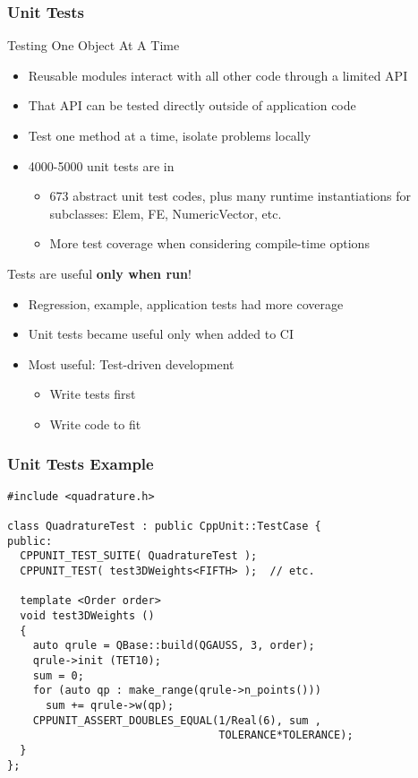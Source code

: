 \begin{frame}
\frametitle{Unit Tests}
\begin{block}{Testing One Object At A Time}
\begin{itemize}
\item Reusable modules interact with all other code through a limited
API
\item That API can be tested directly outside of application code
\item Test one method at a time, isolate problems locally
\item 4000-5000 unit tests are in \libMesh{}
\begin{itemize}
  \item 673 abstract unit test codes, plus many runtime instantiations
    for subclasses: Elem, FE, NumericVector, etc.
  \item More test coverage when considering compile-time options
\end{itemize}
\end{itemize}
\end{block}

\pause

\begin{block}{Tests are useful {\bf only when run}!}
\begin{itemize}
\item Regression, example, application tests had more coverage
\item Unit tests became useful only when added to CI
\item Most useful: Test-driven development
\begin{itemize}
    \item Write tests first
    \item Write code to fit
\end{itemize}
\end{itemize}
\end{block}
\end{frame}


\begin{frame}[fragile]
\frametitle{Unit Tests Example}
{\footnotesize
\begin{verbatim}
#include <quadrature.h>

class QuadratureTest : public CppUnit::TestCase {
public:
  CPPUNIT_TEST_SUITE( QuadratureTest );
  CPPUNIT_TEST( test3DWeights<FIFTH> );  // etc.

  template <Order order>
  void test3DWeights ()
  {
    auto qrule = QBase::build(QGAUSS, 3, order);
    qrule->init (TET10);
    sum = 0;
    for (auto qp : make_range(qrule->n_points()))
      sum += qrule->w(qp);
    CPPUNIT_ASSERT_DOUBLES_EQUAL(1/Real(6), sum ,
                                 TOLERANCE*TOLERANCE);
  }
};
\end{verbatim}
}
\end{frame}




